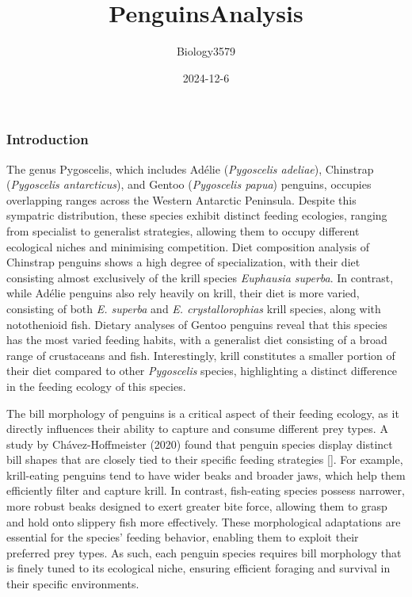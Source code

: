 \documentclass[
]{article}
\title{PenguinsAnalysis}
\author{Biology3579}
\date{2024-12-6}
\begin{document}
\maketitle

\subsubsection{Introduction}\label{introduction}

The genus Pygoscelis, which includes Adélie (\emph{Pygoscelis adeliae}),
Chinstrap (\emph{Pygoscelis antarcticus}), and Gentoo (\emph{Pygoscelis
papua}) penguins, occupies overlapping ranges across the Western
Antarctic Peninsula. Despite this sympatric distribution, these species
exhibit distinct feeding ecologies, ranging from specialist to
generalist strategies, allowing them to occupy different ecological
niches and minimising competition. Diet composition analysis of
Chinstrap penguins shows a high degree of specialization, with their
diet consisting almost exclusively of the krill species \emph{Euphausia
superba}. In contrast, while Adélie penguins also rely heavily on krill,
their diet is more varied, consisting of both \emph{E. superba} and
\emph{E. crystallorophias} krill species, along with notothenioid fish.
Dietary analyses of Gentoo penguins reveal that this species has the
most varied feeding habits, with a generalist diet consisting of a broad
range of crustaceans and fish. Interestingly, krill constitutes a
smaller portion of their diet compared to other \emph{Pygoscelis}
species, highlighting a distinct difference in the feeding ecology of
this species.

The bill morphology of penguins is a critical aspect of their feeding
ecology, as it directly influences their ability to capture and consume
different prey types. A study by Chávez-Hoffmeister (2020) found that
penguin species display distinct bill shapes that are closely tied to
their specific feeding strategies {[}{]}. For example, krill-eating
penguins tend to have wider beaks and broader jaws, which help them
efficiently filter and capture krill. In contrast, fish-eating species
possess narrower, more robust beaks designed to exert greater bite
force, allowing them to grasp and hold onto slippery fish more
effectively. These morphological adaptations are essential for the
species' feeding behavior, enabling them to exploit their preferred prey
types. As such, each penguin species requires bill morphology that is
finely tuned to its ecological niche, ensuring efficient foraging and
survival in their specific environments.
\end{document}
